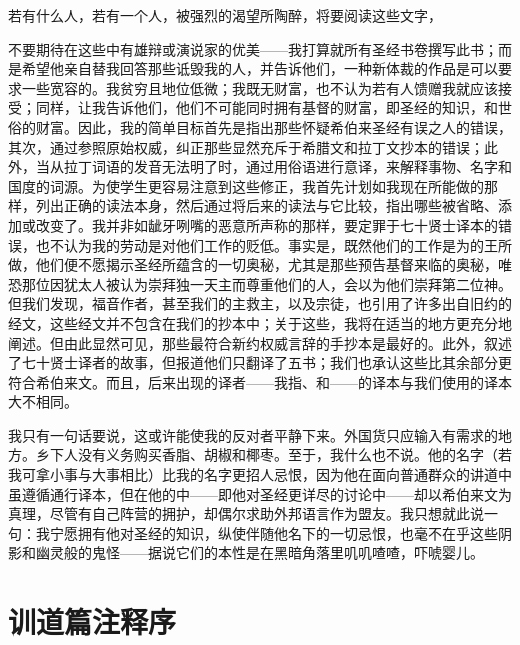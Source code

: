 若有什么人，若有一个人，\newline{}被强烈的渴望所陶醉，将要阅读这些文字，\par

不要期待在这些中有雄辩或演说家的优美——我打算就所有圣经书卷撰写此书；而是希望他亲自替我回答那些诋毁我的人，并告诉他们，一种新体裁的作品是可以要求一些宽容的。我贫穷且地位低微；我既无财富，也不认为若有人馈赠我就应该接受；同样，让我告诉他们，他们不可能同时拥有基督的财富，即圣经的知识，和世俗的财富。因此，我的简单目标首先是指出那些怀疑希伯来圣经有误之人的错误，其次，通过参照原始权威，纠正那些显然充斥于希腊文和拉丁文抄本的错误；此外，当从拉丁词语的发音无法明了时，通过用俗语进行意译，来解释事物、名字和国度的词源。为使学生更容易注意到这些修正，我首先计划如我现在所能做的那样，列出正确的读法本身，然后通过将后来的读法与它比较，指出哪些被省略、添加或改变了。我并非如龇牙咧嘴的恶意所声称的那样，要定罪于七十贤士译本的错误，也不认为我的劳动是对他们工作的贬低。事实是，既然他们的工作是为的王所做，他们便不愿揭示圣经所蕴含的一切奥秘，尤其是那些预告基督来临的奥秘，唯恐那位因犹太人被认为崇拜独一天主而尊重他们的人，会以为他们崇拜第二位神。但我们发现，福音作者，甚至我们的主救主，以及宗徒，也引用了许多出自旧约的经文，这些经文并不包含在我们的抄本中；关于这些，我将在适当的地方更充分地阐述。但由此显然可见，那些最符合新约权威言辞的手抄本是最好的。此外，叙述了七十贤士译者的故事，但报道他们只翻译了五书；我们也承认这些比其余部分更符合希伯来文。而且，后来出现的译者——我指、和——的译本与我们使用的译本大不相同。\par

我只有一句话要说，这或许能使我的反对者平静下来。外国货只应输入有需求的地方。乡下人没有义务购买香脂、胡椒和椰枣。至于，我什么也不说。他的名字（若我可拿小事与大事相比）比我的名字更招人忌恨，因为他在面向普通群众的讲道中虽遵循通行译本，但在他的中——即他对圣经更详尽的讨论中——却以希伯来文为真理，尽管有自己阵营的拥护，却偶尔求助外邦语言作为盟友。我只想就此说一句：我宁愿拥有他对圣经的知识，纵使伴随他名下的一切忌恨，也毫不在乎这些阴影和幽灵般的鬼怪——据说它们的本性是在黑暗角落里叽叽喳喳，吓唬婴儿。\par


\section{训道篇注释序}

